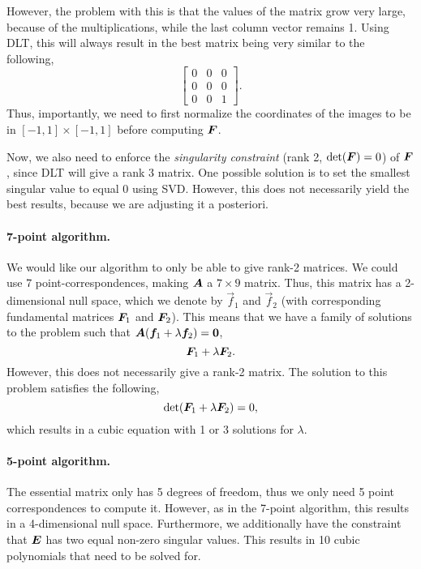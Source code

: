 However, the problem with this is that the values of the matrix grow very large,
because of the multiplications, while the last column vector remains 1. Using
DLT, this will always result in the best matrix being very similar to the
following, \[
    \begin{bmatrix}
        0 & 0 & 0 \\
        0 & 0 & 0 \\
        0 & 0 & 1
    \end{bmatrix}.
\]
Thus, importantly, we need to first normalize the coordinates of the images to
be in $[-1, 1]\times[-1, 1]$ before computing $\bm{F}$.

Now, we also need to enforce the \textit{singularity constraint} (rank 2,
$\det{\mat{F}}=0$) of $\bm{F}$, since DLT will give a rank 3 matrix. One
possible solution is to set the smallest singular value to equal 0 using
SVD. However, this does not necessarily yield the best results, because we are
adjusting it a posteriori.

\paragraph{7-point algorithm.}

We would like our algorithm to only be able to give rank-2 matrices. We could
use 7 point-correspondences, making $\bm{A}$ a $7\times 9$ matrix. Thus, this matrix has a 2-dimensional null space, which we
denote by $\vec{f}_1$ and $\vec{f}_2$ (with corresponding fundamental matrices
$\bm{F}_1$ and $\bm{F}_2$). This means that we have a family of solutions to
the problem such that $\bm{A} (\bm{f}_1 + \lambda \bm{f}_2) = \bm{0}$, \[
    \bm{F}_1 + \lambda \bm{F}_2.
\]
However, this does not necessarily give a rank-2 matrix. The solution to this
problem satisfies the following, \[
    \det{\mat{F}_1 + \lambda \mat{F}_2} = 0,
\]
which results in a cubic equation with 1 or 3 solutions for $\lambda$.

\paragraph{5-point algorithm.}

The essential matrix only has 5 degrees of freedom, thus we only need 5 point
correspondences to compute it. However, as in the 7-point algorithm, this
results in a 4-dimensional null space. Furthermore, we additionally have the
constraint that $\bm{E}$ has two equal non-zero singular values. This results
in 10 cubic polynomials that need to be solved for.


